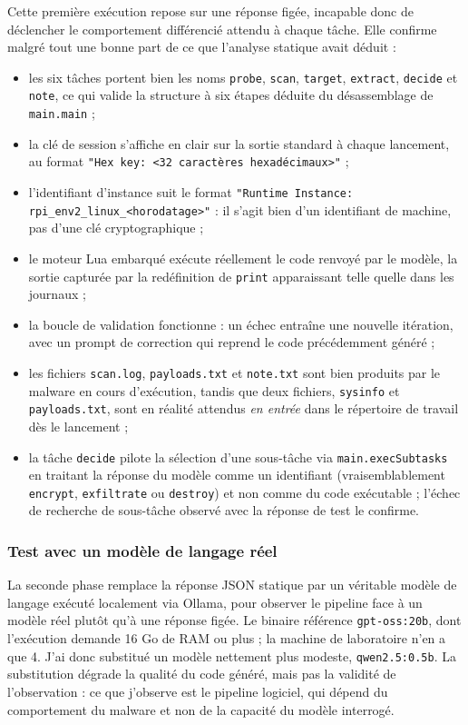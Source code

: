 Cette première exécution repose sur une réponse figée, incapable donc de déclencher le comportement différencié attendu à chaque tâche. Elle confirme malgré tout une bonne part de ce que l'analyse statique avait déduit :

\begin{itemize}
    \item les six tâches portent bien les noms \texttt{probe}, \texttt{scan}, \texttt{target}, \texttt{extract}, \texttt{decide} et \texttt{note}, ce qui valide la structure à six étapes déduite du désassemblage de \texttt{main.main} ;
    \item la clé de session s'affiche en clair sur la sortie standard à chaque lancement, au format \texttt{"Hex key: <32 caractères hexadécimaux>"} ;
    \item l'identifiant d'instance suit le format \texttt{"Runtime Instance: rpi\_env2\_linux\_<horodatage>"} : il s'agit bien d'un identifiant de machine, pas d'une clé cryptographique ;
    \item le moteur Lua embarqué exécute réellement le code renvoyé par le modèle, la sortie capturée par la redéfinition de \texttt{print} apparaissant telle quelle dans les journaux ;
    \item la boucle de validation fonctionne : un échec entraîne une nouvelle itération, avec un prompt de correction qui reprend le code précédemment généré ;
    \item les fichiers \texttt{scan.log}, \texttt{payloads.txt} et \texttt{note.txt} sont bien produits par le malware en cours d'exécution, tandis que deux fichiers, \texttt{sysinfo} et \texttt{payloads.txt}, sont en réalité attendus \emph{en entrée} dans le répertoire de travail dès le lancement ;
    \item la tâche \texttt{decide} pilote la sélection d'une sous-tâche via \texttt{main.execSubtasks} en traitant la réponse du modèle comme un identifiant (vraisemblablement \texttt{encrypt}, \texttt{exfiltrate} ou \texttt{destroy}) et non comme du code exécutable ; l'échec de recherche de sous-tâche observé avec la réponse de test le confirme.
\end{itemize}

\subsubsection{Test avec un modèle de langage réel}
\label{subsubsec:test-llm-reel}

La seconde phase remplace la réponse JSON statique par un véritable modèle de langage exécuté localement via Ollama, pour observer le pipeline face à un modèle réel plutôt qu'à une réponse figée. Le binaire référence \texttt{gpt-oss:20b}, dont l'exécution demande 16 Go de RAM ou plus ; la machine de laboratoire n'en a que 4. J'ai donc substitué un modèle nettement plus modeste, \texttt{qwen2.5:0.5b}. La substitution dégrade la qualité du code généré, mais pas la validité de l'observation : ce que j'observe est le pipeline logiciel, qui dépend du comportement du malware et non de la capacité du modèle interrogé.

